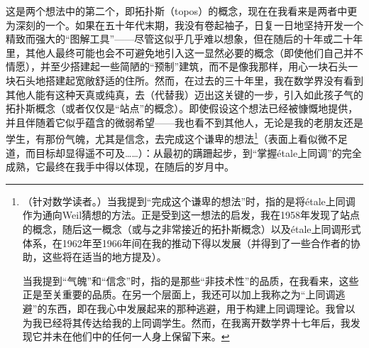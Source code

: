 这是两个想法中的第二个，即拓扑斯（topos）的概念，现在在我看来是两者中更为深刻的一个。如果在五十年代末期，我没有卷起袖子，日复一日地坚持开发一个精致而强大的“图解工具”——尽管这似乎几乎难以想象，但在随后的十年或二十年里，其他人最终可能也会不可避免地引入这一显然必要的概念（即使他们自己并不情愿），并至少搭建起一些简陋的“预制”建筑，而不是像我那样，用心一块石头一块石头地搭建起宽敞舒适的住所。然而，在过去的三十年里，我在数学界没有看到其他人能有这种天真或纯真，去（代替我）迈出这关键的一步，引入如此孩子气的拓扑斯概念（或者仅仅是“站点”的概念）。即使假设这个想法已经被慷慨地提供，并且伴随着它似乎蕴含的微弱希望——我也看不到其他人，无论是我的老朋友还是学生，有那份气魄，尤其是信念，去完成这个谦卑的想法\footnote{（针对数学读者。）当我提到“完成这个谦卑的想法”时，指的是将étale上同调作为通向Weil猜想的方法。正是受到这一想法的启发，我在1958年发现了站点的概念，随后这一概念（或与之非常接近的拓扑斯概念）以及étale上同调形式体系，在1962年至1966年间在我的推动下得以发展（并得到了一些合作者的协助，这些将在适当的地方提及）。

当我提到“气魄”和“信念”时，指的是那些“非技术性”的品质，在我看来，这些正是至关重要的品质。在另一个层面上，我还可以加上我称之为“上同调逃避”的东西，即在我心中发展起来的那种逃避，用于构建上同调理论。我曾以为我已经将其传达给我的上同调学生。然而，在我离开数学界十七年后，我发现它并未在他们中的任何一人身上保留下来。}（表面上看似微不足道，而目标却显得遥不可及……）：从最初的蹒跚起步，到“掌握étale上同调”的完全成熟，它最终在我手中得以体现，在随后的岁月中。